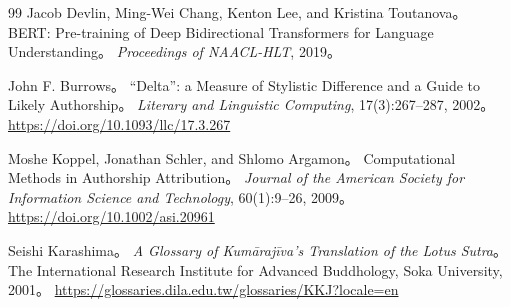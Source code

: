 \documentclass[uplatex,dvipdfmx,11pt,a4paper]{jsarticle}
\begin{document}
\begin{thebibliography}{99}
Jacob Devlin, Ming-Wei Chang, Kenton Lee, and Kristina Toutanova。
\newblock BERT: Pre-training of Deep Bidirectional Transformers for Language Understanding。
\newblock \textit{Proceedings of NAACL-HLT}, 2019。

John F. Burrows。
\newblock ``Delta'': a Measure of Stylistic Difference and a Guide to Likely Authorship。
\newblock \textit{Literary and Linguistic Computing}, 17(3):267--287, 2002。
\newblock \url{https://doi.org/10.1093/llc/17.3.267}

Moshe Koppel, Jonathan Schler, and Shlomo Argamon。
\newblock Computational Methods in Authorship Attribution。
\newblock \textit{Journal of the American Society for Information Science and Technology}, 60(1):9--26, 2009。
\newblock \url{https://doi.org/10.1002/asi.20961}

Seishi Karashima。
\newblock \textit{A Glossary of Kumārajīva's Translation of the Lotus Sutra}。
\newblock The International Research Institute for Advanced Buddhology, Soka University, 2001。
\newblock \url{https://glossaries.dila.edu.tw/glossaries/KKJ?locale=en}

\end{thebibliography}
\end{document}
